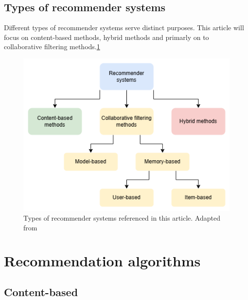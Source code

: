 \documentclass[10pt,twoside,english,a4paper]{article}
\begin{document}
\subsection{Types of recommender systems}

Different types of recommender systems serve distinct purposes. This article will focus on content-based methods, hybrid methods and primarly on to collaborative filtering methods.\ref{fig:fig2}

\begin{figure}[H]
	\includegraphics[width=1\textwidth]{./diagrams/recommender_systems_types.png}
	\caption{Types of recommender systems referenced in this article. Adapted from \cite{10113923}}
	\label{fig:fig2}
\end{figure}






\section{Recommendation algorithms}

\subsection{Content-based}
\end{document}
